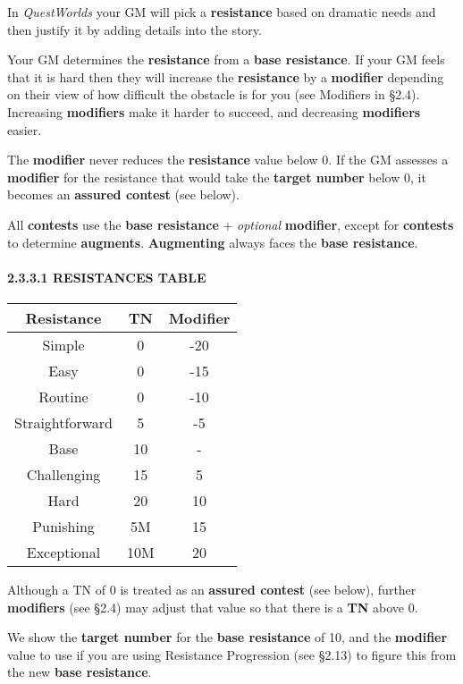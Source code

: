 \documentclass[
  11pt,
]{article}
\begin{document}
In \emph{QuestWorlds} your GM will pick a \textbf{resistance} based on
dramatic needs and then justify it by adding details into the story.

Your GM determines the \textbf{resistance} from a \textbf{base
resistance}. If your GM feels that it is hard then they will increase
the \textbf{resistance} by a \textbf{modifier} depending on their view
of how difficult the obstacle is for you (see Modifiers in §2.4).
Increasing \textbf{modifiers} make it harder to succeed, and decreasing
\textbf{modifiers} easier.

The \textbf{modifier} never reduces the \textbf{resistance} value below
0. If the GM assesses a \textbf{modifier} for the resistance that would
take the \textbf{target number} below 0, it becomes an \textbf{assured
contest} (see below).

All \textbf{contests} use the \textbf{base resistance} + \emph{optional}
\textbf{modifier}, except for \textbf{contests} to determine
\textbf{augments}. \textbf{Augmenting} always faces the \textbf{base
resistance}.

\hypertarget{resistances-table}{%
\paragraph{2.3.3.1 RESISTANCES TABLE}\label{resistances-table}}

\begin{longtable}[]{@{}ccc@{}}
\toprule
Resistance & TN & Modifier \\
\midrule
\endhead
Simple & 0 & -20 \\
Easy & 0 & -15 \\
Routine & 0 & -10 \\
Straightforward & 5 & -5 \\
Base & 10 & - \\
Challenging & 15 & 5 \\
Hard & 20 & 10 \\
Punishing & 5M & 15 \\
Exceptional & 10M & 20 \\
\bottomrule
\end{longtable}

Although a TN of 0 is treated as an \textbf{assured contest} (see
below), further \textbf{modifiers} (see §2.4) may adjust that value so
that there is a \textbf{TN} above 0.

We show the \textbf{target number} for the \textbf{base resistance} of
10, and the \textbf{modifier} value to use if you are using Resistance
Progression (see §2.13) to figure this from the new \textbf{base
resistance}.
\end{document}

